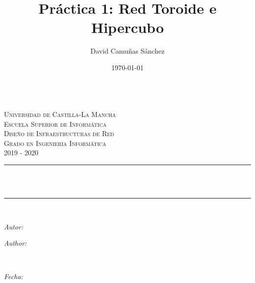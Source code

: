\documentclass[11pt]{article}
\title{Práctica 1: Red Toroide e Hipercubo}							%
\author{David Camuñas Sánchez}							%
\date{\today}											%
\makeatletter
\newif\ifspanish %
\newif\ifmultipleauthors %
\newcommand{\subject}{Diseño de Infraestructuras de Red}						%
\newcommand{\course}{Grado en Ingeniería Informática}	%
\newcommand{\courseyear}{2019 - 2020} 					%
\newcommand{\dateText}{Fecha:}
\newcommand{\dateText}{Date:}
\let\thetitle\@title
\let\theauthor\@author
\let\thedate\@date
\makeatother
\begin{document}

\begin{titlepage}
	\centering
	\begin{minipage}[t]{\textwidth}
		\hspace{\fill}
	\end{minipage}
	\\[2.25 cm]
    \textsc{\LARGE Universidad de Castilla-La Mancha}\\[1 cm]	%
    \textsc{\LARGE Escuela Superior de Informática}\\[2.0 cm]
	\textsc{\Large \subject}\\[0.5 cm]				%
	\textsc{\large \course \\ \courseyear}\\[2 cm]				%
	\rule{\linewidth}{0.2 mm} \\[0.4 cm]
	{ \huge \bfseries \thetitle}\\
	\rule{\linewidth}{0.2 mm} \\[2.5 cm]

	\vspace*{\fill}
	\begin{minipage}{0.4\textwidth}
		\begin{flushleft} \large
			\ifspanish
				\ifmultipleauthors
					\emph{Autores:}\\
				\else
					\emph{Autor:}\\
				\fi
			\else
				\ifmultipleauthors
					\emph{Authors:}\\
				\else
					\emph{Author:}\\
				\fi
			\fi
			\theauthor
			\end{flushleft}
			\end{minipage}~
			\begin{minipage}{0.4\textwidth}
			\begin{flushright} \large
			\emph{\dateText} \\
			\thedate
		\end{flushright}
	\end{minipage}\\[2.25 cm]


\end{titlepage}
\end{document}
